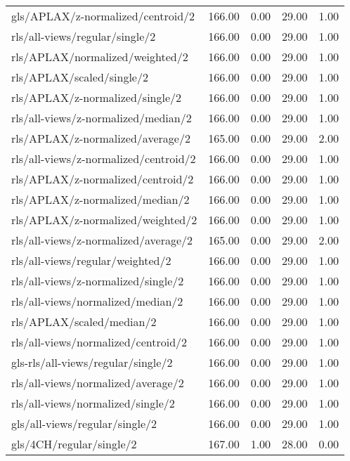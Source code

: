 \begin{longtable}{lrrrr}
    gls/APLAX/z-normalized/centroid/2         & 166.00 &  0.00 & 29.00 &  1.00 \\
    rls/all-views/regular/single/2            & 166.00 &  0.00 & 29.00 &  1.00 \\
    rls/APLAX/normalized/weighted/2           & 166.00 &  0.00 & 29.00 &  1.00 \\
    rls/APLAX/scaled/single/2                 & 166.00 &  0.00 & 29.00 &  1.00 \\
    rls/APLAX/z-normalized/single/2           & 166.00 &  0.00 & 29.00 &  1.00 \\
    rls/all-views/z-normalized/median/2       & 166.00 &  0.00 & 29.00 &  1.00 \\
    rls/APLAX/z-normalized/average/2          & 165.00 &  0.00 & 29.00 &  2.00 \\
    rls/all-views/z-normalized/centroid/2     & 166.00 &  0.00 & 29.00 &  1.00 \\
    rls/APLAX/z-normalized/centroid/2         & 166.00 &  0.00 & 29.00 &  1.00 \\
    rls/APLAX/z-normalized/median/2           & 166.00 &  0.00 & 29.00 &  1.00 \\
    rls/APLAX/z-normalized/weighted/2         & 166.00 &  0.00 & 29.00 &  1.00 \\
    rls/all-views/z-normalized/average/2      & 165.00 &  0.00 & 29.00 &  2.00 \\
    rls/all-views/regular/weighted/2          & 166.00 &  0.00 & 29.00 &  1.00 \\
    rls/all-views/z-normalized/single/2       & 166.00 &  0.00 & 29.00 &  1.00 \\
    rls/all-views/normalized/median/2         & 166.00 &  0.00 & 29.00 &  1.00 \\
    rls/APLAX/scaled/median/2                 & 166.00 &  0.00 & 29.00 &  1.00 \\
    rls/all-views/normalized/centroid/2       & 166.00 &  0.00 & 29.00 &  1.00 \\
    gls-rls/all-views/regular/single/2        & 166.00 &  0.00 & 29.00 &  1.00 \\
    rls/all-views/normalized/average/2        & 166.00 &  0.00 & 29.00 &  1.00 \\
    rls/all-views/normalized/single/2         & 166.00 &  0.00 & 29.00 &  1.00 \\
    gls/all-views/regular/single/2            & 166.00 &  0.00 & 29.00 &  1.00 \\
    gls/4CH/regular/single/2                  & 167.00 &  1.00 & 28.00 &  0.00 \\

\end{longtable}
